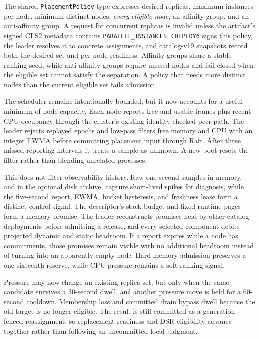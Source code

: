 The shared \texttt{PlacementPolicy} type expresses desired replicas, maximum
instances per node, minimum distinct nodes, \emph{every eligible node}, an
affinity group, and an anti-affinity group. A request for concurrent
replicas is invalid unless the artifact's signed CLS2 metadata contains
\texttt{PARALLEL\_INSTANCES}. \texttt{CDEPLOY6} signs this policy, the
leader resolves it to concrete assignments, and catalog-v19 snapshots record
both the desired set and per-node readiness. Affinity groups share a stable
ranking seed, while anti-affinity groups require unused nodes and fail closed when
the eligible set cannot satisfy the separation. A policy that needs more
distinct nodes than the current eligible set fails admission.

The scheduler remains intentionally bounded, but it now accounts for a useful
minimum of node capacity. Each node reports free and usable frames plus recent
CPU occupancy through the cluster's existing identity-checked peer path. The
leader rejects replayed epochs and low-pass filters free memory and CPU with an
integer EWMA before committing placement input through Raft. After three
missed reporting intervals it treats a sample as unknown. A new boot
resets the filter rather than blending unrelated processes.

This does not filter observability history. Raw one-second samples in memory,
and in the optional disk archive, capture
short-lived spikes for diagnosis, while the five-second report, EWMA, bucket
hysteresis, and freshness lease form a distinct control signal. The
descriptor's stack budget and fixed runtime pages form a memory promise. The
leader reconstructs promises held by other catalog deployments before
admitting a release, and every selected component debits projected dynamic and
static headroom. If a report expires while a node has commitments, those
promises remain visible with no additional headroom instead of turning into an
apparently empty node. Hard memory admission preserves a one-sixteenth reserve,
while CPU pressure remains a soft ranking signal.

Pressure may now change an existing replica set, but only when the same
candidate survives a 30-second dwell, and another pressure move is held for a
60-second cooldown. Membership loss and committed drain bypass dwell because
the old target is no longer eligible. The result is still committed as a
generation-fenced reassignment, so replacement readiness and DSR eligibility
advance together rather than following an uncommitted local judgment.

